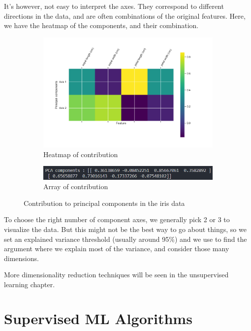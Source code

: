 \documentclass{article}
\newcommand{\code}[1]{{\fontfamily{zi4} \selectfont{#1}}}
\begin{document}
It's however, not easy to interpret the axes. They correspond to different directions in the data, and are often combinations of the original features. Here, we have the heatmap of the components, and their combination.

\begin{figure}[H]
\centering
\begin{subfigure}{.6\textwidth}
  \centering
  \includegraphics[width=\linewidth]{Images/iris_heatmap_pca.png}
  \caption{Heatmap of contribution}
\end{subfigure}%
\begin{subfigure}{.4\textwidth}
  \centering
  \includegraphics[width=\linewidth]{Images/iris_pca_components.png}
  \caption{Array of contribution}
\end{subfigure}
\caption{Contribution to principal components in the iris data}
\end{figure}

To choose the right number of component axes, we generally pick 2 or 3 to visualize the data. But this might not be the best way to go about things, so we set an explained variance threshold (usually around 95\%) and we use \code{numpy.cumsum()} to find the argument where we explain most of the variance, and consider those many dimensions.

More dimensionality reduction techniques will be seen in the unsupervised learning chapter.


\section{Supervised ML Algorithms}
\end{document}
